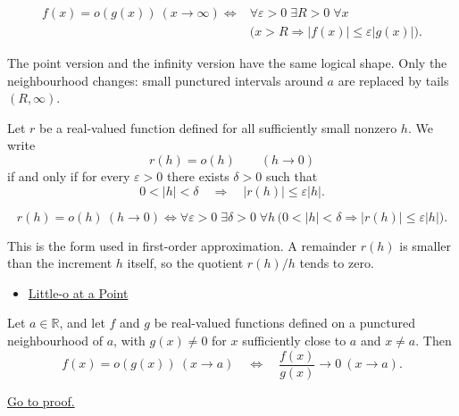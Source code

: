 \begin{remark*}
\[
\begin{aligned}
f(x)=o(g(x))\ (x\to\infty)
\Longleftrightarrow
&\forall\varepsilon>0\;\exists R>0\;\forall x\\
&\bigl(x>R\Rightarrow |f(x)|\leq \varepsilon |g(x)|\bigr).
\end{aligned}
\]
\end{remark*}

\begin{remark*}[Interpretation]
The point version and the infinity version have the same logical shape. Only
the neighbourhood changes: small punctured intervals around $a$ are replaced
by tails $(R,\infty)$.
\end{remark*}

\NoLocalDependencies

\begin{definition}
\label{def:increment-little-o}
Let $r$ be a real-valued function defined for all sufficiently small nonzero
$h$. We write
\[
  r(h)=o(h)\qquad (h\to 0)
\]
if and only if for every $\varepsilon>0$ there exists $\delta>0$ such that
\[
  0<|h|<\delta
  \quad\Longrightarrow\quad
  |r(h)|\leq \varepsilon |h|.
\]
\end{definition}

\begin{remark*}
\[
r(h)=o(h)\ (h\to 0)
\Longleftrightarrow
\forall\varepsilon>0\;\exists\delta>0\;\forall h\,
\bigl(0<|h|<\delta\Rightarrow |r(h)|\leq \varepsilon |h|\bigr).
\]
\end{remark*}

\begin{remark*}[Interpretation]
This is the form used in first-order approximation. A remainder $r(h)$ is
smaller than the increment $h$ itself, so the quotient $r(h)/h$ tends to zero.
\end{remark*}

\begin{dependencies}
\begin{itemize}
  \item \hyperref[def:little-o-at-a-point]{Little-o at a Point}
\end{itemize}
\end{dependencies}

\begin{proposition}
\label{prop:little-o-quotient-characterization}
Let $a\in\mathbb{R}$, and let $f$ and $g$ be real-valued functions defined on a
punctured neighbourhood of $a$, with $g(x)\neq 0$ for $x$ sufficiently close to
$a$ and $x\neq a$. Then
\[
  f(x)=o(g(x))\ (x\to a)
  \quad\Longleftrightarrow\quad
  \frac{f(x)}{g(x)}\to 0\ (x\to a).
\]

\smallskip\noindent
\hyperref[prf:little-o-quotient-characterization]{Go to proof.}
\end{proposition}

